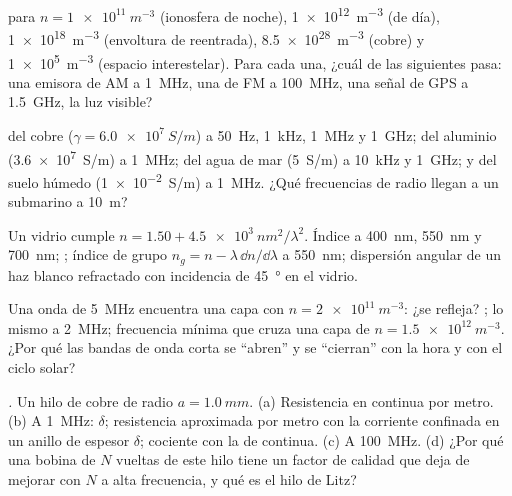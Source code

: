 \begin{exercise}[$\star$]\label{exo:b2:waves-in-media:1}
 para $n = \qty{1e11}{m^{-3}}$ (ionosfera de noche),
\qty{1e12}{m^{-3}} (de día), \qty{1e18}{m^{-3}} (envoltura de reentrada), \qty{8.5e28}{m^{-3}}
(cobre) y \qty{1e5}{m^{-3}} (espacio interestelar). Para cada una, ¿cuál de
las siguientes pasa: una emisora de AM a \qty{1}{MHz}, una de FM a \qty{100}{MHz}, una
señal de GPS a \qty{1.5}{GHz}, la luz visible?
\end{exercise}

\begin{exercise}[$\star$]\label{exo:b2:waves-in-media:2}
 del cobre ($\gamma = \qty{6.0e7}{S/m}$) a \qty{50}{Hz}, \qty{1}{kHz},
\qty{1}{MHz} y \qty{1}{GHz}; del aluminio (\qty{3.6e7}{S/m}) a \qty{1}{MHz}; del agua
de mar (\qty{5}{S/m}) a \qty{10}{kHz} y \qty{1}{GHz}; y del suelo húmedo (\qty{1e-2}{S/m})
a \qty{1}{MHz}. ¿Qué frecuencias de radio llegan a un submarino a \qty{10}{m}?
\end{exercise}

\begin{exercise}[$\star$]\label{exo:b2:waves-in-media:3}
Un vidrio cumple $n = 1.50 + \qty{4.5e3}{nm^2}/\lambda^2$. Índice a \qty{400}{nm},
\qty{550}{nm} y \qty{700}{nm}; ; índice de grupo $n_g = n -
\lambda\,\dd n/\dd\lambda$ a \qty{550}{nm}; dispersión angular de un haz blanco
refractado con incidencia de \qty{45}{\degree} en el vidrio.
\end{exercise}

\begin{exercise}[$\star$]\label{exo:b2:waves-in-media:4}
Una onda de \qty{5}{MHz} encuentra una capa con $n = \qty{2e11}{m^{-3}}$: ¿se
refleja? ; lo mismo a \qty{2}{MHz}; frecuencia mínima
que cruza una capa de $n = \qty{1.5e12}{m^{-3}}$. ¿Por qué las bandas de onda
corta se ``abren'' y se ``cierran'' con la hora y con el ciclo solar?
\end{exercise}

\begin{exercise}[$\star\star$]\label{exo:b2:waves-in-media:5}
\emph{.} Un hilo de cobre de radio $a = \qty{1.0}{mm}$. (a) Resistencia
en continua por metro. (b) A \qty{1}{MHz}: $\delta$; resistencia aproximada
por metro con la corriente confinada en un anillo de espesor $\delta$;
cociente con la de continua. (c) A \qty{100}{MHz}. (d) ¿Por qué una bobina de $N$ vueltas de
este hilo tiene un factor de calidad que deja de mejorar con $N$ a alta
frecuencia, y qué es el hilo de Litz?
\end{exercise}

